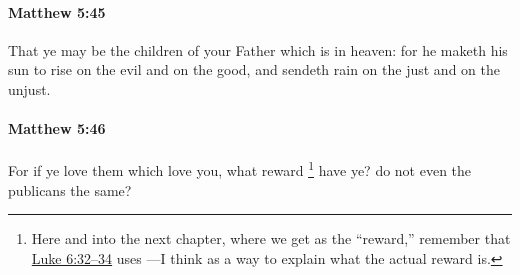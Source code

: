 		\paragraph{Matthew 5:45} %
			\label{MATTHEW-5-45}

			That ye may be the children of your Father which is in heaven: for he maketh his sun to rise on the evil and on the good, and sendeth rain on the just and on the unjust.

			\begin{framed}
			\scriptsize
				\begin{compactdesc}
					\item[SBLG] 
				\end{compactdesc}
			\end{framed}

		\paragraph{Matthew 5:46} %
			\label{MATTHEW-5-46}

			For if ye love them which love you, what reward%
				\footnote{%
					Here and into the next chapter, where we get  as the ``reward,'' remember that \hyperref[LUKE-6-32]{Luke 6:32--34} uses ---I think as a way to explain what the actual reward is.
					}
			have ye? do not even the publicans the same?


